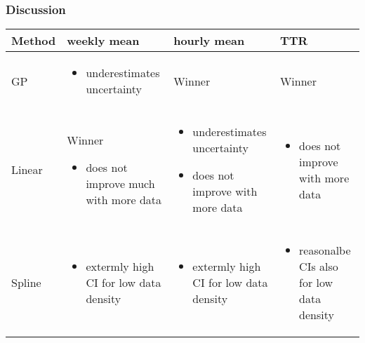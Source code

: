 \documentclass[
	8pt, %
]{beamer}
\begin{document}
\begin{frame}
	\frametitle{Discussion}

	\begin{table}
	\small
	\centering
	\begin{tabular}{|m{1cm}|m{3.2cm}|m{3.2cm}|m{3.2cm}|}

  	\hline

  	Method & weekly mean & hourly mean & TTR \\
	\hline

	GP & \cellcolor{green}
	 \begin{itemize}
		 \item underestimates uncertainty
	 \end{itemize}

	& \cellcolor{green}Winner
	&
	\cellcolor{yellow}Winner
	\\
  	\hline

	Linear
	& \cellcolor{green}Winner
	 \begin{itemize}
		 \item does not improve much with more data
	 \end{itemize}
	& \cellcolor{red}
	 \begin{itemize}
		 \item underestimates uncertainty
		 \item does not improve with more data
	 \end{itemize}
	& \cellcolor{red}
	 \begin{itemize}
	 \item does not improve with more data
	 \end{itemize}
	\\
  	\hline

	Spline
	& \cellcolor{green}
	 \begin{itemize}
		 \item extermly high CI for low data density
	 \end{itemize}
	& \cellcolor{green}
	 \begin{itemize}
		 \item extermly high CI for low data density
	 \end{itemize}
	& \cellcolor{yellow}
	\begin{itemize}
		\item reasonalbe CIs also for low data density
	\end{itemize} \\
  	\hline
	\end{tabular}
	\end{table}


\end{frame}
\end{document}
